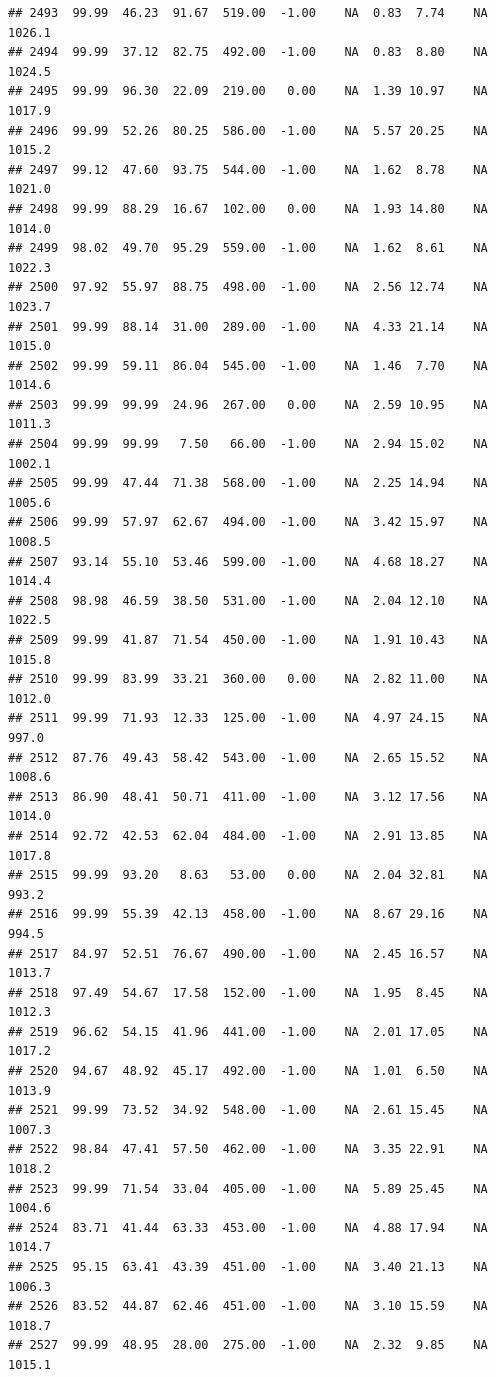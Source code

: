 \documentclass{article}\usepackage{graphicx, color}
\makeatletter
\newenvironment{kframe}{%
 \def\at@end@of@kframe{}%
 \ifinner\ifhmode%
  \def\at@end@of@kframe{\end{minipage}}%
  \begin{minipage}{\columnwidth}%
 \fi\fi%
 \def\FrameCommand##1{\hskip\@totalleftmargin \hskip-\fboxsep
 \colorbox{shadecolor}{##1}\hskip-\fboxsep
     \hskip-\linewidth \hskip-\@totalleftmargin \hskip\columnwidth}%
 \MakeFramed {\advance\hsize-\width
   \@totalleftmargin\z@ \linewidth\hsize
   \@setminipage}}%
 {\par\unskip\endMakeFramed%
 \at@end@of@kframe}
\newenvironment{knitrout}{}{} %
\makeatother
\begin{document}
\begin{knitrout}
\begin{kframe}
\begin{verbatim}
## 2493  99.99  46.23  91.67  519.00  -1.00    NA  0.83  7.74    NA 1026.1
## 2494  99.99  37.12  82.75  492.00  -1.00    NA  0.83  8.80    NA 1024.5
## 2495  99.99  96.30  22.09  219.00   0.00    NA  1.39 10.97    NA 1017.9
## 2496  99.99  52.26  80.25  586.00  -1.00    NA  5.57 20.25    NA 1015.2
## 2497  99.12  47.60  93.75  544.00  -1.00    NA  1.62  8.78    NA 1021.0
## 2498  99.99  88.29  16.67  102.00   0.00    NA  1.93 14.80    NA 1014.0
## 2499  98.02  49.70  95.29  559.00  -1.00    NA  1.62  8.61    NA 1022.3
## 2500  97.92  55.97  88.75  498.00  -1.00    NA  2.56 12.74    NA 1023.7
## 2501  99.99  88.14  31.00  289.00  -1.00    NA  4.33 21.14    NA 1015.0
## 2502  99.99  59.11  86.04  545.00  -1.00    NA  1.46  7.70    NA 1014.6
## 2503  99.99  99.99  24.96  267.00   0.00    NA  2.59 10.95    NA 1011.3
## 2504  99.99  99.99   7.50   66.00  -1.00    NA  2.94 15.02    NA 1002.1
## 2505  99.99  47.44  71.38  568.00  -1.00    NA  2.25 14.94    NA 1005.6
## 2506  99.99  57.97  62.67  494.00  -1.00    NA  3.42 15.97    NA 1008.5
## 2507  93.14  55.10  53.46  599.00  -1.00    NA  4.68 18.27    NA 1014.4
## 2508  98.98  46.59  38.50  531.00  -1.00    NA  2.04 12.10    NA 1022.5
## 2509  99.99  41.87  71.54  450.00  -1.00    NA  1.91 10.43    NA 1015.8
## 2510  99.99  83.99  33.21  360.00   0.00    NA  2.82 11.00    NA 1012.0
## 2511  99.99  71.93  12.33  125.00  -1.00    NA  4.97 24.15    NA  997.0
## 2512  87.76  49.43  58.42  543.00  -1.00    NA  2.65 15.52    NA 1008.6
## 2513  86.90  48.41  50.71  411.00  -1.00    NA  3.12 17.56    NA 1014.0
## 2514  92.72  42.53  62.04  484.00  -1.00    NA  2.91 13.85    NA 1017.8
## 2515  99.99  93.20   8.63   53.00   0.00    NA  2.04 32.81    NA  993.2
## 2516  99.99  55.39  42.13  458.00  -1.00    NA  8.67 29.16    NA  994.5
## 2517  84.97  52.51  76.67  490.00  -1.00    NA  2.45 16.57    NA 1013.7
## 2518  97.49  54.67  17.58  152.00  -1.00    NA  1.95  8.45    NA 1012.3
## 2519  96.62  54.15  41.96  441.00  -1.00    NA  2.01 17.05    NA 1017.2
## 2520  94.67  48.92  45.17  492.00  -1.00    NA  1.01  6.50    NA 1013.9
## 2521  99.99  73.52  34.92  548.00  -1.00    NA  2.61 15.45    NA 1007.3
## 2522  98.84  47.41  57.50  462.00  -1.00    NA  3.35 22.91    NA 1018.2
## 2523  99.99  71.54  33.04  405.00  -1.00    NA  5.89 25.45    NA 1004.6
## 2524  83.71  41.44  63.33  453.00  -1.00    NA  4.88 17.94    NA 1014.7
## 2525  95.15  63.41  43.39  451.00  -1.00    NA  3.40 21.13    NA 1006.3
## 2526  83.52  44.87  62.46  451.00  -1.00    NA  3.10 15.59    NA 1018.7
## 2527  99.99  48.95  28.00  275.00  -1.00    NA  2.32  9.85    NA 1015.1

\end{verbatim}
\end{kframe}
\end{knitrout}
\end{document}
